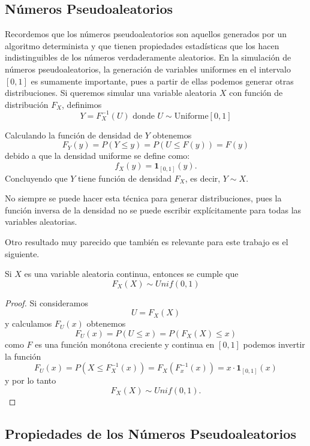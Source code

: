 \documentclass[../Main.tex]{subfiles}
\begin{document}
\subsection{Números Pseudoaleatorios}

Recordemos que los números pseudoaleatorios son aquellos generados por un algoritmo determinista y que tienen propiedades estadísticas que los hacen indistinguibles de los números verdaderamente aleatorios. En la simulación de números pseudoaleatorios, la generación de variables uniformes en el intervalo $[0,1]$ es sumamente importante, pues a partir de ellas podemos generar otras distribuciones. Si queremos simular una variable aleatoria $X$ con función de distribución $F_X$, definimos \[Y=F^{-1}_X(U)\text{  donde   }U\sim \mathrm{Uniforme}[0,1]\] 

Calculando la función de densidad de $Y$ obtenemos
\[F_Y(y)=P(Y\leq y)=P(U\leq F(y))=F(y)\] debido a que la densidad uniforme se define como:
\[f_X(y)=\mathbf{1}_{[0,1]}(y).\] 
Concluyendo que $Y$ tiene función de densidad $F_X$, es decir, $Y\sim X$.
\begin{remark}
\label{}
    No siempre se puede hacer esta técnica para generar distribuciones, pues la función inversa de la densidad no se puede escribir explícitamente para todas las variables aleatorias.
\end{remark}
Otro resultado muy parecido que también es relevante para este trabajo es el siguiente. 
\begin{proposition}
\label{prop:inv}
    Si $X$ es una variable aleatoria continua, entonces se cumple que \[F_X(X)\sim Unif(0,1)\]
\end{proposition}
\begin{proof}
Si consideramos \[U=F_X(X)\] y calculamos $F_U(x)$ obtenemos
    \[F_U(x)=P(U\leq x) = P(F_X(X)\leq x) \]
    como $F$ es una función monótona creciente y continua en $[0,1]$ podemos invertir la función 
    \[F_U(x)= P(X\leq F^{-1}_X(x))=F_X(F^{-1}_x(x))=x \cdot \mathbf{1}_{[0,1]}(x)\] y por lo tanto  \[F_X(X)\sim Unif(0,1).\]
\end{proof}
\subsection{Propiedades de los Números Pseudoaleatorios}
\end{document}
